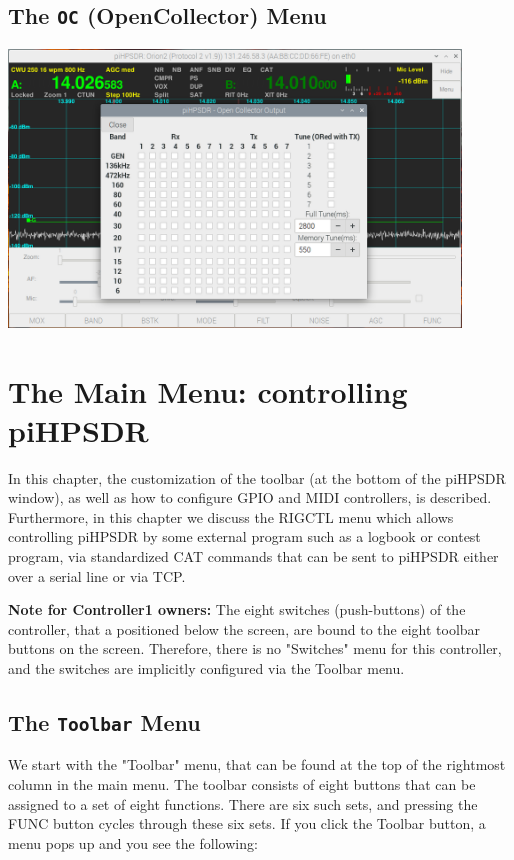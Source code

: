 \documentclass[12pt]{book}
\begin{document}
\section{The \texttt{OC} (OpenCollector) Menu}
\begin{center}
\includegraphics[width=12cm]{OCMenu.png}
\end{center}

\chapter{The Main Menu: controlling piHPSDR}

In this chapter, the customization of the toolbar (at the bottom of the piHPSDR window),
as well as how to configure GPIO and MIDI controllers, is described. Furthermore, in this
chapter we discuss the RIGCTL menu which allows controlling piHPSDR by some external program
such as a logbook or contest program, via standardized CAT commands that can be sent to
piHPSDR either over a serial line or via TCP.

\textbf{Note for Controller1 owners:} The eight switches (push-buttons) of the controller,
that a positioned below the screen, are bound to the eight toolbar buttons on the screen.
Therefore, there is no "Switches" menu for this controller, and the switches are implicitly
configured via the Toolbar menu.

\section{The \texttt{Toolbar} Menu}
We start with the "Toolbar" menu, that can be found at the top of the rightmost
column in the main menu. The toolbar consists of eight buttons that can be assigned
to a set of eight functions. There are six such sets, and pressing the FUNC button
cycles through these six sets. If you click the Toolbar button, a menu pops up and
you see the following:
\end{document}

